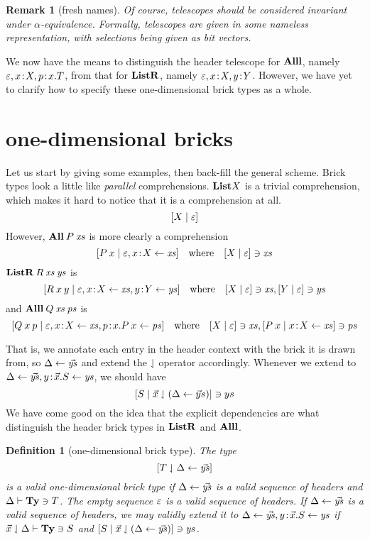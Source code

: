 \documentclass{article}
\newtheorem{defn}[thm]{Definition}
\newtheorem{rem}{Remark}[thm]
\begin{document}
\begin{rem}[fresh names]
  Of course, telescopes should be considered invariant under $\alpha$-equivalence. Formally, telescopes are given in some nameless representation, with selections being given as bit vectors.
\end{rem}

We now have the means to distinguish the header telescope for $\mathbf{Alll}$, namely $\varepsilon,x\!:\! X,p\!:\! x.T$, from that for $\mathbf{ListR}$, namely $\varepsilon,x\!:\! X, y\!:\! Y$. However, we have yet to clarify how to specify these one-dimensional brick types as a whole.


\section{one-dimensional bricks}

Let us start by giving some examples, then back-fill the general scheme. Brick types look a little like \emph{parallel} comprehensions. $\mathbf{List} X$ is a trivial comprehension, which makes it hard to notice that it is a comprehension at all.
\[
  [X\;|\;\varepsilon]
\]
However, $\mathbf{All}\:P\:\mathit{xs}$ is more clearly a comprehension
\[
  [P\:x\;|\; \varepsilon, x\!:\! X\leftarrow\mathit{xs}]
  \quad\mbox{where}\quad
  [X\;|\;\varepsilon]\ni \mathit{xs}
\]
$\mathbf{ListR}\:R\:\mathit{xs}\:\mathit{ys}$ is
\[
  [R\:x\:y\;|\; \varepsilon, x\!:\! X\leftarrow\mathit{xs}, y\!:\! Y\leftarrow\mathit{ys}]
  \quad\mbox{where}\quad
  [X\;|\;\varepsilon]\ni \mathit{xs}, [Y\;|\;\varepsilon]\ni \mathit{ys}
\]
and $\mathbf{Alll}\:Q\:\mathit{xs}\:\mathit{ps}$ is
\[
  [Q\:x\:p\;|\; \varepsilon, x\!:\! X\leftarrow\mathit{xs}, p\!:\! x.P\:x\leftarrow\mathit{ps}]
  \quad\mbox{where}\quad
  [X\;|\;\varepsilon]\ni \mathit{xs}, [P\:x\;|\; x\!:\! X\leftarrow\mathit{xs}]\ni \mathit{ps}
\]

That is, we annotate each entry in the header context with the brick it is drawn from, so $\Delta\leftarrow\vec{\mathit{ys}}$ and extend the $\downharpoonleft$ operator accordingly. Whenever we extend to $\Delta\leftarrow\vec{\mathit{ys}},y\!:\!\vec x.S\leftarrow \mathit{ys}$, we should have
\[
  [S\;|\; \vec x\downharpoonleft(\Delta\leftarrow\vec ys)]\ni ys
\]
We have come good on the idea that the explicit dependencies are what distinguish the header brick types in $\mathbf{ListR}$ and $\mathbf{Alll}$.

\begin{defn}[one-dimensional brick type]
  The type
  \[
    [T\downharpoonleft\Delta\leftarrow\vec{\mathit{ys}}]
  \]
  is a valid one-dimensional brick type if $\Delta\leftarrow\vec{\mathit{ys}}$ is a valid sequence of headers and $\Delta\vdash\mathbf{Ty}\ni T$.
  The empty sequence $\varepsilon$ is a valid sequence of headers. If $\Delta\leftarrow\vec{\mathit{ys}}$ is a valid sequence of headers, we may validly extend it to $\Delta\leftarrow\vec{\mathit{ys}},y\!:\!\vec x.S\leftarrow \mathit{ys}$ if $\vec x\downharpoonleft\Delta\vdash \mathbf{Ty}\ni S$ and $[S\;|\;\vec x\downharpoonleft(\Delta\leftarrow\vec{\mathit{ys}})]\ni\mathit{ys}$.
\end{defn}
\end{document}
